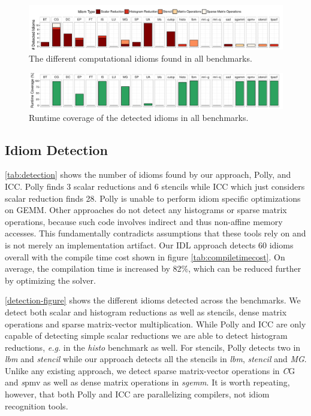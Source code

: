 \begin{figure}[t]
  \centering
  \includegraphics[width=\textwidth]{figures/asplosplots/detection.pdf}
  \caption{The different computational idioms found in all benchmarks.}
  \label{detection-figure}
\end{figure}
\begin{figure}[t]
  \centering
  \includegraphics[width=\textwidth]{figures/asplosplots/coverage.pdf}
  \caption{Runtime coverage of the detected idioms in all benchmarks.}
  \label{coverage-figure}
  \vspace{0.5em}
\end{figure}

\subsection{Idiom Detection}

    \autoref{tab:detection} shows the number of idioms found by our approach, Polly, and ICC.
    Polly finds 3 scalar reductions and 6 stencils while ICC which just considers  scalar reduction finds 28.
    Polly is unable to perform idiom specific optimizations on GEMM.
    Other approaches do not detect any histograms or sparse matrix operations, because such code involves indirect and thus non-affine memory accesses.
    This fundamentally contradicts assumptions that these tools rely on and is not merely an implementation artifact.
    Our IDL approach detects 60 idioms overall with the compile time cost shown in figure \autoref{tab:compiletimecost}.
    On average, the compilation time is increased by 82\%, which can be reduced further by optimizing the solver.

    \autoref{detection-figure} shows the different idioms detected across
    the  benchmarks. We detect both scalar
    and histogram reductions as well as stencils, dense matrix operations
    and sparse matrix-vector multiplication.
    While Polly and ICC are only capable of detecting simple scalar
    reductions we are able to detect histogram reductions, {\em e.g.} in
    the \emph{histo} benchmark as well.  For stencils, Polly detects two
    in \emph{lbm} and \emph{stencil} while our approach
    detects all the stencils in \emph{lbm}, \emph{stencil} and \emph{MG}.
    Unlike any existing approach, we detect sparse matrix-vector
    operations in {\emph CG} and {\emph spmv} as well as dense matrix
    operations in \emph{sgemm}. It is worth repeating, however, that both
    Polly and ICC are parallelizing compilers, not idiom recognition
    tools.


